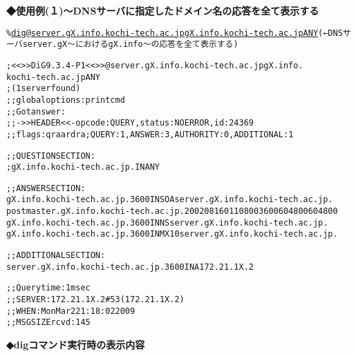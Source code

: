 \noindent
{\bf ◆使用例(１)〜DNSサーバに指定したドメイン名の応答を全て表示する}
\begin{center}
\begin{breakbox}
\begin{alltt}
\% \underline{dig @server.gX.info.kochi-tech.ac.jp gX.info.kochi-tech.ac.jp ANY}  (←DNSサーバserver.gX〜におけるgX.info〜の応答を全て表示する)

; <<>> DiG 9.3.4-P1 <<>> @server.gX.info.kochi-tech.ac.jp gX.info.
kochi-tech.ac.jp ANY 
; (1 server found)
;; global options:  printcmd
;; Got answer:
;; ->>HEADER<<- opcode: QUERY, status: NOERROR, id: 24369
;; flags: qr aa rd ra; QUERY: 1, ANSWER: 3, AUTHORITY: 0, ADDITIONAL: 1

;; QUESTION SECTION:
;gX.info.kochi-tech.ac.jp. IN      ANY

;; ANSWER SECTION:
gX.info.kochi-tech.ac.jp. 3600 IN  SOA  server.gX.info.kochi-tech.ac.jp.
 postmaster.gX.info.kochi-tech.ac.jp. 2002081601 10800 3600 604800 604800
gX.info.kochi-tech.ac.jp. 3600 IN  NS   server.gX.info.kochi-tech.ac.jp.
gX.info.kochi-tech.ac.jp. 3600 IN  MX   10 server.gX.info.kochi-tech.ac.jp.

;; ADDITIONAL SECTION:
server.gX.info.kochi-tech.ac.jp. 3600 IN A   172.21.1X.2

;; Query time: 1 msec
;; SERVER: 172.21.1X.2\#53(172.21.1X.2)
;; WHEN: Mon Mar  2 21:18:02 2009
;; MSG SIZE  rcvd: 145

\end{alltt}
\end{breakbox}
\end{center}
{\bf ◆digコマンド実行時の表示内容}
